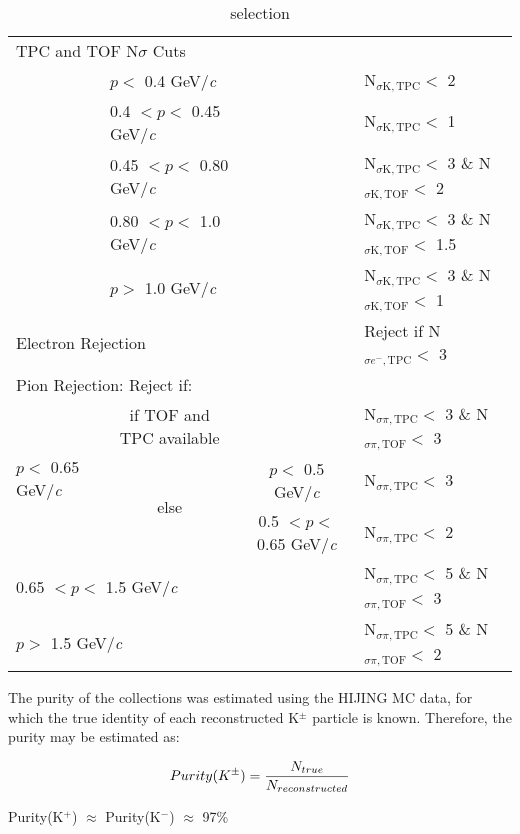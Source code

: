\documentclass[/home/jesse/Analysis/FemtoAnalysis/AnalysisNotes/AnalysisNoteJBuxton.tex]{subfiles}
\begin{document}
\begin{table}[htbp]
\begin{tabular}{lc|c|l}
   \multicolumn{4}{l}{TPC and TOF N$\sigma$ Cuts} \\
   \cline{2-4}
    & \multicolumn{1}{l}{$p <$ 0.4 GeV/\textit{c}} &  & N$_{\sigma \mathrm{K,TPC}} <$ 2 \\
   \cline{2-4}
    & \multicolumn{1}{l}{0.4 $< p <$ 0.45 GeV/\textit{c}} & & N$_{\sigma \mathrm{K,TPC}} <$ 1 \\
   \cline{2-4}     
    & \multicolumn{1}{l}{0.45 $< p <$ 0.80 GeV/\textit{c}} & & N$_{\sigma \mathrm{K,TPC}} <$ 3 \& N$_{\sigma \mathrm{K,TOF}} <$ 2 \\ 
   \cline{2-4}
    & \multicolumn{1}{l}{0.80 $< p <$ 1.0 GeV/\textit{c}} & & N$_{\sigma \mathrm{K,TPC}} <$ 3 \& N$_{\sigma \mathrm{K,TOF}} <$ 1.5 \\ 
   \cline{2-4}
    & \multicolumn{1}{l}{$p >$ 1.0 GeV/\textit{c}} & & N$_{\sigma \mathrm{K,TPC}} <$ 3 \& N$_{\sigma \mathrm{K,TOF}} <$ 1 \\ 
   \hline
   \multicolumn{3}{l|}{Electron Rejection} & Reject if N$_{\sigma e^{-},\mathrm{TPC}} < $ 3 \\
   \hline
   
   \multicolumn{4}{l}{Pion Rejection:  Reject if:} \\
   \hline
   \multirow{3}{*}{$p <$ 0.65 GeV/\textit{c}} & if TOF and TPC available & \multicolumn{1}{c}{} & N$_{\sigma \pi,\mathrm{TPC}} <$ 3 \& N$_{\sigma \pi,\mathrm{TOF}} <$ 3 \\
   \cline{2-4}
    & \multirow{2}{*}{else} & $p <$ 0.5 GeV/\textit{c} & N$_{\sigma \pi,\mathrm{TPC}} <$ 3 \\
   \cline{3-4}
    &  & 0.5 $< p <$ 0.65 GeV/\textit{c} & N$_{\sigma \pi,\mathrm{TPC}} <$ 2 \\
   \cline{2-4}
   \multicolumn{3}{l|}{0.65 $< p <$ 1.5 GeV/\textit{c}} & N$_{\sigma \pi,\mathrm{TPC}} <$ 5 \& N$_{\sigma \pi,\mathrm{TOF}} <$ 3 \\
   \cline{2-4}
   \multicolumn{3}{l|}{$p >$ 1.5 GeV/\textit{c}} & N$_{\sigma \pi,\mathrm{TPC}} <$ 5 \& N$_{\sigma \pi,\mathrm{TOF}} <$ 2 \\
   \hline
  \end{tabular}
 \caption{\Kpm selection}
 \label{tab:KchCuts} 
\end{table}

 
 

The purity of the \Kpm collections was estimated using the HIJING MC data, for which the true identity of each reconstructed K$^{\pm}$ particle is known.  Therefore, the purity may be estimated as:

\begin{equation}
 Purity(K^{\pm}) = \frac{N_{true}}{N_{reconstructed}} \\
\label{eqn:KchPurity}
\end{equation}

Purity(K$^{+}$) $\approx$ Purity(K$^{-}$) $\approx$ 97\%
\end{document}
